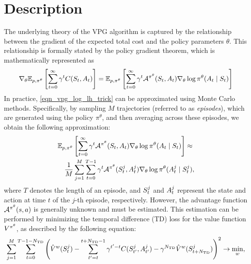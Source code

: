 \documentclass[12pt,twoside]{../../mitthesis}
\begin{document}
\section*{Description}
The underlying theory of the VPG algorithm is captured by the relationship between the gradient of the expected total cost and the policy parameters $\theta$. 
This relationship is formally stated by the policy gradient theorem, which is mathematically represented as
\begin{equation}
    \label{eqn_vpg_log_lh_trick}
    \nabla_{\theta} \E[\transit, \policy^{\theta}]{\sum_{t = 0}^{\infty} \gamma ^ t \Cost(\State_{t}, \Action_{t})} =  \E[\transit, \policy^{\theta}]{ \sum_{t = 0}^{\infty}\gamma^t\Advan^{\policy^{\theta}} (\State_t, \Action_t)\nabla_{\theta} \log \policy^{\theta}(\Action_t \mid \State_t)}
\end{equation}
In practice, \eqref{eqn_vpg_log_lh_trick} can be approximated using Monte Carlo methods. Specifically, by sampling $M$ trajectories (referred to as \textit{episodes}), which are generated using the policy $\pi^{\theta}$, and then averaging across these episodes, we obtain the following approximation:
\begin{equation}
    \label{eqn_vpg_objective_est0}
    \begin{aligned}
&\E[\transit, \policy^{\theta}]{ \sum_{t = 0}^{\infty}\gamma^t\Advan^{\policy^{\theta}} (\State_t, \Action_t)\nabla_{\theta} \log \policy^{\theta}(\Action_t \mid \State_t)} \approx \\ 
&\quad\frac{1}{M} \sum_{j = 1}^M \sum_{t=0}^{T-1} \gamma ^ t \Advan^{\policy^{\theta}}(\State_t^j, \Action_t^j) \nabla_{\theta} \log \policy^{\theta}(\Action_t^j \mid \State_t^j),
    \end{aligned}
\end{equation}
where $T$ denotes the length of an episode, and  $S_t^j$  and $A_t^j$ represent the state and action at time $t$ of the $j$-th episode, respectively.
However, the advantage function $\mathcal A^{\pi^{\theta}}(s, a)$ is generally unknown and must be estimated. This estimation can be performed by minimizing the temporal difference (TD) loss for the value function  $V^{\pi^{\theta}}$, as described by the following equation:
\begin{equation}
    \label{eqn_td_loss}
    \sum_{j=1}^M\sum_{t=0}^{T-1 - N_{\text{TD}}}\left(\hat\Value^w(\State_t^j) - \sum_{t'=t}^{t + N_{\text{TD}} - 1} \gamma^{t'-t}\Cost(\State_{t'}^j, \Action_{t'}^j) - \gamma^{N_{\text{TD}}}\hat\Value^w(\State_{t + N_{\text{TD}}}^j)\right)^2 \ra \min_{w},
\end{equation}
\end{document}
